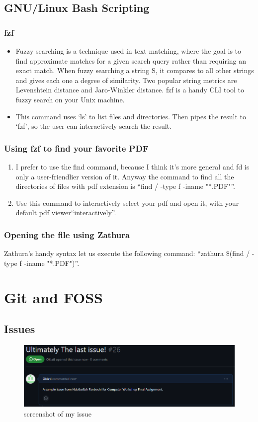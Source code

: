 \documentclass[12pt]{article}
\begin{document}
\subsection{GNU/Linux Bash Scripting}
\subsubsection{fzf}
\begin{itemize}
    \item Fuzzy searching is a technique used in text matching, where the goal is to find approximate matches for a given search query rather than requiring an exact match. When fuzzy searching a string S, it compares to all other strings and gives each one a degree of similarity. Two popular string metrics are Levenshtein distance and Jaro-Winkler distance. fzf is a handy CLI tool to fuzzy search on your Unix machine.
    \item This command uses `ls' to list files and directories. Then pipes the result to `fzf', so the user can interactively search the result.
\end{itemize}

\subsubsection{Using fzf to find your favorite PDF}
\begin{enumerate}
    \item I prefer to use the find command, because I think it's more general and fd is only a user-friendlier version of it. Anyway the command to find all the directories of files with pdf extension is ``find / -type f -iname "*.PDF"''.
    \item Use this command to interactively select your pdf and open it, with your default pdf viewer``interactively''.
\end{enumerate}

\subsubsection{Opening the file using Zathura}
Zathura's handy syntax let us execute the following command: \newline``zathura \$(find / -type f -iname "*.PDF")''.

\newpage

\section{Git and FOSS}
\subsection{Issues}
\newline

\begin{figure}
    \centering
    \includegraphics{Screenshot 2024-01-27 225143.png}
    \caption{screenshot of my issue}
\end{figure}
\end{document}
